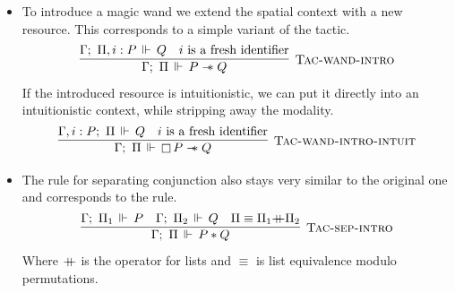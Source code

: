 \begin{itemize}
\item To introduce a magic wand we extend the spatial context with a new resource.
  This corresponds to a simple variant of the  tactic.
  \[\infer[\textsc{Tac-wand-intro}]
      {\entailsD P \wand Q}
      {\entails {\IntuD} {\SpatD, i : P} {Q} &
       i \text{ is a fresh identifier}}
  \]
  If the introduced resource is intuitionistic, we can put it directly into an intuitionistic context, while stripping away the modality.
  \[\infer[\textsc{Tac-wand-intro-intuit}]
      {\entailsD \intuit P \wand Q}
      {\entails {\IntuD, i : P} {\SpatD} {Q} &
       i \text{ is a fresh identifier}}
  \]
\item The rule for separating conjunction also stays very similar to the original one and corresponds to the  rule.
  \[\infer[\textsc{Tac-sep-intro}]
      {\entailsD P * Q}
      {\entails {\IntuD} {\SpatD_1} P &
       \entails {\IntuD} {\SpatD_2} Q &
       \SpatD \equiv \SpatD_1 {+\hspace{-0.5em}+} \SpatD_2}
   \]
   Where \({+\hspace{-0.5em}+}\) is the  operator for lists and \(\equiv\) is list equivalence modulo permutations.


\end{itemize}
